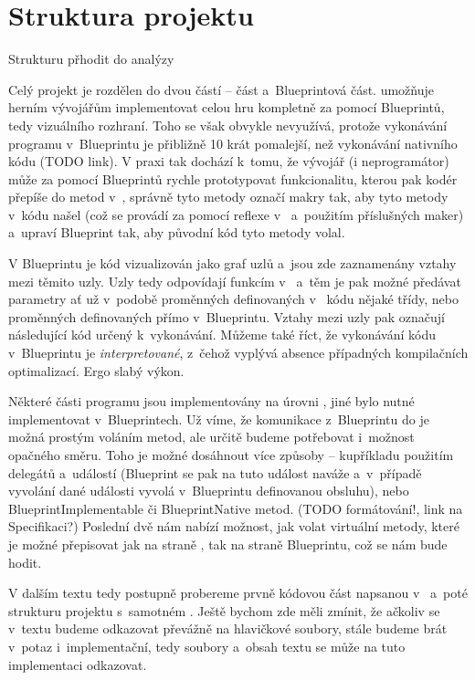 
\section{Struktura projektu}

Strukturu přhodit do analýzy

Celý projekt je rozdělen do dvou částí -- \CPP{} část a~Blueprintová část. \UE{} umožňuje herním vývojářům implementovat celou hru kompletně za pomocí Blueprintů, tedy vizuálního rozhraní. Toho se však obvykle nevyužívá, protože vykonávání programu v~Blueprintu je přibližně 10 krát pomalejší, než vykonávání nativního \CPP{} kódu (TODO link). V praxi tak dochází k~tomu, že vývojář (i neprogramátor) může za pomocí Blueprintů rychle prototypovat funkcionalitu, kterou pak kodér přepíše do metod v~\CPP{}, správně tyto metody označí makry tak, aby \UE{} tyto metody v~kódu našel (což se provádí za pomocí reflexe v~\UBT{} a~použitím příslušných \CPP{} maker) a~upraví Blueprint tak, aby původní kód tyto metody volal.

 V Blueprintu je kód vizualizován jako graf uzlů a~jsou zde zaznamenány vztahy mezi těmito uzly. Uzly tedy odpovídají funkcím v~\CPP{} a~těm je pak možné předávat parametry ať už v~podobě proměnných definovaných v~\CPP{} kódu nějaké třídy, nebo proměnných definovaných přímo v~Blueprintu. Vztahy mezi uzly pak označují následující kód určený k~vykonávání. Můžeme také říct, že vykonávání kódu v~Blueprintu je \textit{interpretované}, z~čehož vyplývá absence případných kompilačních optimalizací. Ergo slabý výkon. 

Některé části programu jsou implementovány na úrovni \CPP{}, jiné bylo nutné implementovat v~Blueprintech. Už víme, že komunikace z~Blueprintu do \CPP{} je možná prostým voláním metod, ale určitě budeme potřebovat i~možnost opačného směru. Toho je možné dosáhnout více způsoby -- kupříkladu použitím delegátů a~událostí (Blueprint se pak na tuto událost naváže a~v~případě vyvolání dané události vyvolá v~Blueprintu definovanou obsluhu), nebo BlueprintImplementable či BlueprintNative metod. (TODO formátování!, link na Specifikaci?) Poslední dvě nám nabízí možnost, jak volat virtuální metody, které je možné přepisovat jak na straně \CPP{}, tak na straně Blueprintu, což se nám bude hodit.

V dalším textu tedy postupně probereme prvně kódovou část napsanou v~\CPP{} a~poté strukturu projektu s~samotném \UE{}. Ještě bychom zde měli zmínit, že ačkoliv se v~textu budeme odkazovat převážně na hlavičkové soubory, stále budeme brát v~potaz i~implementační, tedy  soubory a~obsah textu se může na tuto implementaci odkazovat.


